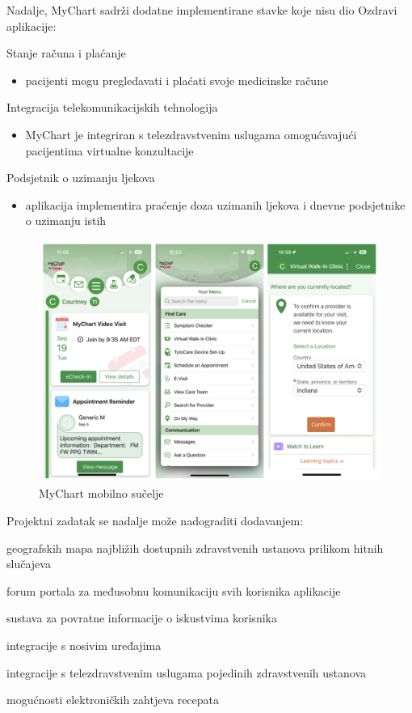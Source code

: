 		Nadalje, MyChart sadrži dodatne implementirane stavke koje nisu dio Ozdravi aplikacije:
		\begin{packed_enum}
			\item Stanje računa i plaćanje
			\begin{itemize}
				\item pacijenti mogu pregledavati i plaćati svoje medicinske račune
			\end{itemize}
			\item Integracija telekomunikacijskih tehnologija
			\begin{itemize}
				\item MyChart je integriran s telezdravstvenim uslugama omogućavajući pacijentima virtualne konzultacije
			\end{itemize}
			\item Podsjetnik o uzimanju ljekova
			\begin{itemize}
				\item aplikacija implementira praćenje doza uzimanih ljekova i dnevne podsjetnike o uzimanju istih
			\end{itemize}
		\end{packed_enum}

		\begin{figure}[H]
			\includegraphics[scale=0.4]{slike/myChartMobileView.PNG}
			\centering
			\caption{MyChart mobilno sučelje}
			\label{fig:myChart}
		\end{figure}
		
		Projektni zadatak se nadalje može nadograditi dodavanjem:
		
		\begin{packed_item}
			\item geografskih mapa najbližih dostupnih zdravstvenih ustanova prilikom hitnih slučajeva
			\item forum portala za međusobnu komunikaciju svih korisnika aplikacije
			\item sustava za povratne informacije o iskustvima korisnika
			\item integracije s nosivim uređajima
			\item integracije s telezdravstvenim uslugama pojedinih zdravstvenih ustanova
			\item mogućnosti elektroničkih zahtjeva recepata
		\end{packed_item}